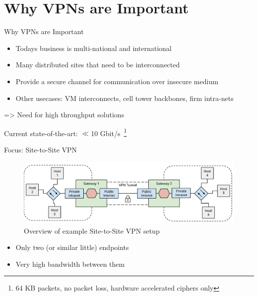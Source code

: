\documentclass[NET,english]{tumbeamer}
\begin{document}

%

%

\section{Why VPNs are Important}
\begin{frame}{Why VPNs are Important}
	\begin{itemize}
		\item Todays business is multi-national and international
		\item Many distributed sites that need to be interconnected
		\item Provide a secure channel for communication over insecure medium
		\item Other usecases: VM interconnects, cell tower backbones, firm intra-nets
	\end{itemize}
	
	=> Need for high throughput solutions
	
	Current state-of-the-art: $\ll$10 Gbit/s~\footnote{64 KB packets, no packet loss, hardware accelerated ciphers only}
\end{frame}

\begin{frame}{Focus: Site-to-Site VPN}
	\begin{figure}
		\centering
		\includegraphics[width=1\linewidth]{figures/Site_to_Site_VPN}
		\caption{Overview of example Site-to-Site VPN setup}
		\label{fig:sitetositevpn}
	\end{figure}
	
	\begin{itemize}
		\item Only two (or similar little) endpoints
		\item Very high bandwidth between them
	\end{itemize}
\end{frame}
\end{document}
